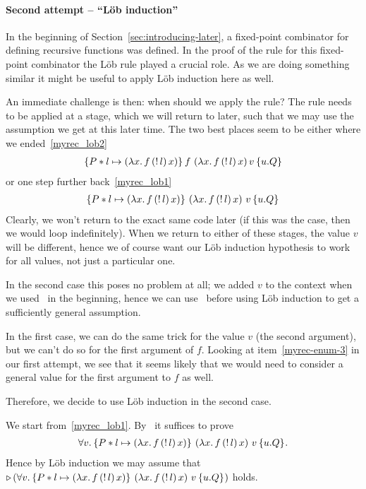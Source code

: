 \paragraph*{Second attempt -- ``L{\"o}b induction''}
In the beginning of Section~\ref{sec:introducing-later}, a fixed-point combinator for defining recursive functions was defined. In the proof of the rule for this fixed-point combinator the L{\"o}b rule played a crucial role. As we are doing something similar it might be useful to apply L{\"o}b induction here as well.

An immediate challenge is then: when should we apply the rule?
The rule needs to be applied at a stage, which we will return to later, such that we may use the assumption we get at this later time. The two best places seem to be either where we ended~\eqref{myrec_lob2}
\begin{align*}
\hoare{P * l \pointsto \left(\lambda x.\, f \, (\deref{l})\, x  \right)}{f \, \left(\lambda x.\, f \, (\deref{l})\, x  \right) v}{u.Q}
\end{align*}
or one step further back~\eqref{myrec_lob1}
\begin{align*}
\hoare{P * l \pointsto \left(\lambda x.\, f \, (\deref{l})\, x  \right)}{\left(\lambda x.\, f \, (\deref{l})\, x  \right) \, v}{u.Q}
\end{align*}
Clearly, we won't return to the exact same code later (if this was the case, then we would loop indefinitely). When we return to either of these stages, the value $v$ will be different, hence we of course want our L{\"o}b induction hypothesis to work for all values, not just a particular one. 

In the second case  this poses no problem at all; we added $v$ to the context when we used~ in the beginning, hence we can use~ before using L{\"o}b induction to get a sufficiently general assumption. 

In the first case, we can do the same trick for the value $v$ (the second argument), but we can't do so for the first argument of $f$. Looking at item~\eqref{myrec-enum-3} in our first attempt, we see that it seems likely that we would need to consider a general value for the first argument to $f$ as well.

Therefore, we decide to use L{\"o}b induction in the second case.

We start from~\eqref{myrec_lob1}. By~ it suffices to prove
\begin{align*}
\All v. \hoare{P * l \pointsto \left(\lambda x.\, f \, (\deref{l})\, x  \right)}{\left(\lambda x.\, f \, (\deref{l})\, x  \right) \, v}{u.Q}.
\end{align*}
Hence by L{\"o}b induction we may assume that $\later \left( \All v. \hoare{P * l \pointsto \left(\lambda x.\, f \, (\deref{l})\, x  \right)}{\left(\lambda x.\, f \, (\deref{l})\, x  \right) \, v}{u.Q}\right)$ holds.

